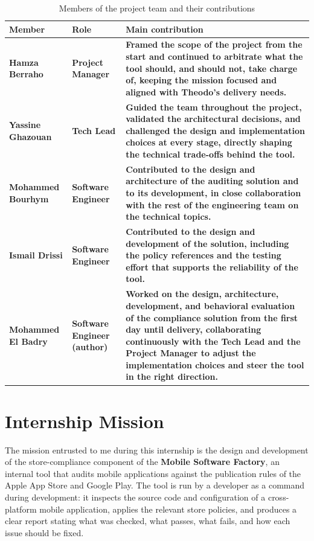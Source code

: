 \begin{table}[h]
\centering
\renewcommand{\arraystretch}{1.4}
\begin{tabular}{|>{\raggedright\arraybackslash}p{}|>{\raggedright\arraybackslash}p{}|>{\raggedright\arraybackslash}p{}|}
\hline

\textbf{Member} & \textbf{Role} & \textbf{Main contribution} \\
\hline

\textbf{Hamza Berraho} & \textbf{Project Manager} & \textbf{Framed the scope of the project from the start and continued to arbitrate what the tool should, and should not, take charge of, keeping the mission focused and aligned with Theodo's delivery needs.} \\
\hline
\textbf{Yassine Ghazouan} & \textbf{Tech Lead} & \textbf{Guided the team throughout the project, validated the architectural decisions, and challenged the design and implementation choices at every stage, directly shaping the technical trade-offs behind the tool.} \\
\hline
\textbf{Mohammed Bourhym} & \textbf{Software Engineer} & \textbf{Contributed to the design and architecture of the auditing solution and to its development, in close collaboration with the rest of the engineering team on the technical topics.} \\
\hline
\textbf{Ismail Drissi} & \textbf{Software Engineer} & \textbf{Contributed to the design and development of the solution, including the policy references and the testing effort that supports the reliability of the tool.} \\
\hline
\textbf{Mohammed El Badry} & \textbf{Software Engineer (author)} & \textbf{Worked on the design, architecture, development, and behavioral evaluation of the compliance solution from the first day until delivery, collaborating continuously with the Tech Lead and the Project Manager to adjust the implementation choices and steer the tool in the right direction.} \\
\hline
\end{tabular}
\caption{Members of the project team and their contributions}
\end{table}

\section{Internship Mission}

The mission entrusted to me during this internship is the design and development of the store-compliance component of the \textbf{Mobile Software Factory}, an internal tool that audits mobile applications against the publication rules of the Apple App Store and Google Play. The tool is run by a developer as a command during development: it inspects the source code and configuration of a cross-platform mobile application, applies the relevant store policies, and produces a clear report stating what was checked, what passes, what fails, and how each issue should be fixed.

